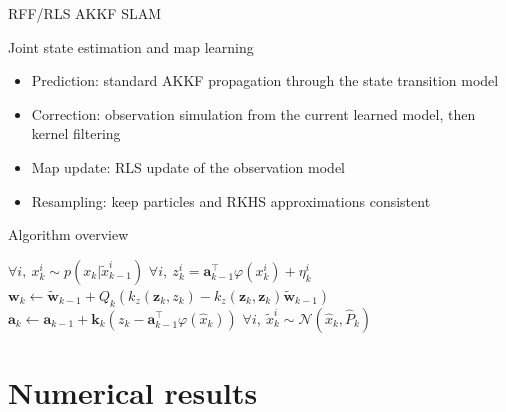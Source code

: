 \documentclass[9pt]{beamer}
\begin{document}
\begin{frame}{RFF/RLS AKKF SLAM}

\begin{block}{Joint state estimation and map learning}
    \begin{itemize}
    \item Prediction: standard AKKF propagation through the state transition model
    \item Correction: observation simulation from the current learned model, then kernel filtering
    \item Map update: RLS update of the observation model
    \item Resampling: keep particles and RKHS approximations consistent
    \end{itemize}
\end{block}

\begin{block}{Algorithm overview}
\begin{algorithmic}
    \State$\forall i,\:x_k^i\sim p(x_k|\tilde{x}_{k-1}^i)$
    \State \textcolor{BrickRed}{$\forall i,\:z_k^i=\mathbf{a}_{k-1}^\top\varphi(x_k^i)+\eta_k^i$}\Comment{\textcolor{BrickRed}{DSSM/RFF correction}}
    \State$\mathbf{w}_k\gets\tilde{\mathbf{w}}_{k-1}+Q_k(k_z(\mathbf{z}_k,z_k)-k_z(\mathbf{z}_k,\mathbf{z}_k)\tilde{\mathbf{w}}_{k-1})$
    \State \textcolor{BrickRed}{$\mathbf{a}_k\gets\mathbf{a}_{k-1}+\mathbf{k}_k(z_k-\mathbf{a}_{k-1}^\top\varphi(\hat{x}_k))$}\Comment{\textcolor{BrickRed}{RFF/RLS map update}}
    \State$\forall i,\:\tilde{x}_k^i\sim\mathcal{N}(\hat{x}_k, \hat{P}_k)$
\end{algorithmic}
\end{block}

\end{frame}

\section{Numerical results}
\end{document}
